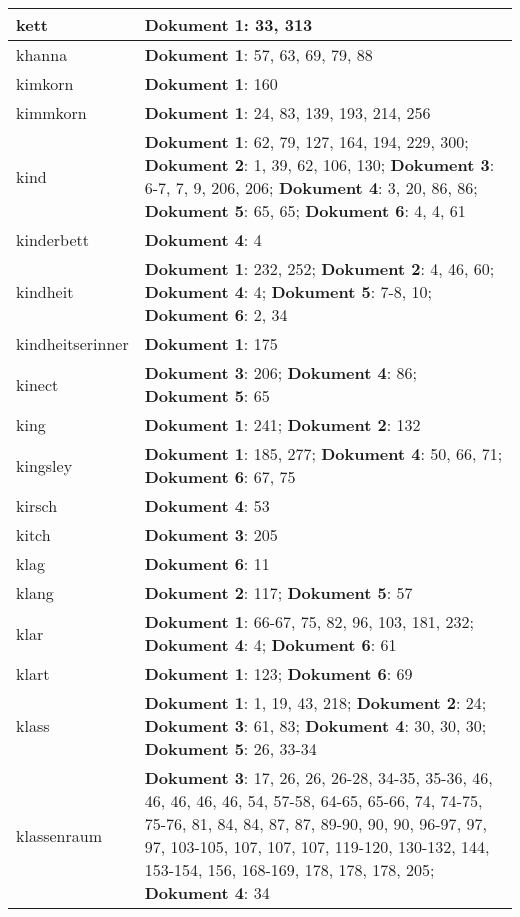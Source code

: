 \documentclass[a5paper]{article}
\begin{document}
\begin{longtable}[l]{|l|p{3in}|}
\hline
kett & \textbf{Dokument 1}: 33, 313 \\
\hline
khanna & \textbf{Dokument 1}: 57, 63, 69, 79, 88 \\
\hline
kimkorn & \textbf{Dokument 1}: 160 \\
\hline
kimmkorn & \textbf{Dokument 1}: 24, 83, 139, 193, 214, 256 \\
\hline
kind & \textbf{Dokument 1}: 62, 79, 127, 164, 194, 229, 300; \textbf{Dokument 2}: 1, 39, 62, 106, 130; \textbf{Dokument 3}: 6-7, 7, 9, 206, 206; \textbf{Dokument 4}: 3, 20, 86, 86; \textbf{Dokument 5}: 65, 65; \textbf{Dokument 6}: 4, 4, 61 \\
\hline
kinderbett & \textbf{Dokument 4}: 4 \\
\hline
kindheit & \textbf{Dokument 1}: 232, 252; \textbf{Dokument 2}: 4, 46, 60; \textbf{Dokument 4}: 4; \textbf{Dokument 5}: 7-8, 10; \textbf{Dokument 6}: 2, 34 \\
\hline
kindheitserinner & \textbf{Dokument 1}: 175 \\
\hline
kinect & \textbf{Dokument 3}: 206; \textbf{Dokument 4}: 86; \textbf{Dokument 5}: 65 \\
\hline
king & \textbf{Dokument 1}: 241; \textbf{Dokument 2}: 132 \\
\hline
kingsley & \textbf{Dokument 1}: 185, 277; \textbf{Dokument 4}: 50, 66, 71; \textbf{Dokument 6}: 67, 75 \\
\hline
kirsch & \textbf{Dokument 4}: 53 \\
\hline
kitch & \textbf{Dokument 3}: 205 \\
\hline
klag & \textbf{Dokument 6}: 11 \\
\hline
klang & \textbf{Dokument 2}: 117; \textbf{Dokument 5}: 57 \\
\hline
klar & \textbf{Dokument 1}: 66-67, 75, 82, 96, 103, 181, 232; \textbf{Dokument 4}: 4; \textbf{Dokument 6}: 61 \\
\hline
klart & \textbf{Dokument 1}: 123; \textbf{Dokument 6}: 69 \\
\hline
klass & \textbf{Dokument 1}: 1, 19, 43, 218; \textbf{Dokument 2}: 24; \textbf{Dokument 3}: 61, 83; \textbf{Dokument 4}: 30, 30, 30; \textbf{Dokument 5}: 26, 33-34 \\
\hline
klassenraum & \textbf{Dokument 3}: 17, 26, 26, 26-28, 34-35, 35-36, 46, 46, 46, 46, 46, 54, 57-58, 64-65, 65-66, 74, 74-75, 75-76, 81, 84, 84, 87, 87, 89-90, 90, 90, 96-97, 97, 97, 103-105, 107, 107, 107, 119-120, 130-132, 144, 153-154, 156, 168-169, 178, 178, 178, 205; \textbf{Dokument 4}: 34 \\

\end{longtable}
\end{document}
